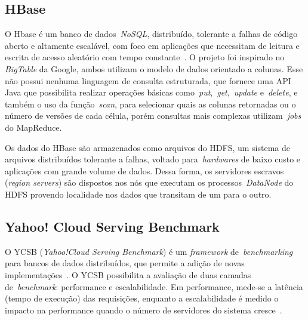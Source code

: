 \documentclass[12pt]{article}
\begin{document}

\subsection{HBase}
\label{subsec:hbase}

O Hbase é um banco de dados~\textit{NoSQL}, distribuído, tolerante a falhas de código aberto e altamente escalável, com foco em aplicações que necessitam de leitura e escrita de acesso aleatório com tempo constante~\cite{hadoophbase}. O projeto foi inspirado no \textit{BigTable} da Google, ambos utilizam o modelo de dados orientado a colunas. Esse não possui nenhuma linguagem de consulta estruturada, que fornece uma API Java que possibilita realizar operações básicas como~\emph{put},~\emph{get},~\emph{update} e~\emph{delete}, e também o uso da função~\emph{scan}, para selecionar quais as colunas retornadas ou o número de versões de cada célula, porém consultas mais complexas utilizam~\emph{jobs} do MapReduce.

Os dados do HBase são armazenados como arquivos do HDFS, um sistema de arquivos distribuídos tolerante a falhas, voltado para~\emph{hardwares} de baixo custo e aplicações com grande volume de dados. Dessa forma, os servidores escravos (\emph{region servers}) são dispostos nos nós que executam os processos~\emph{DataNode} do HDFS provendo localidade nos dados que transitam de um para o outro.

\subsection{Yahoo! Cloud Serving Benchmark}
\label{subsec:ycsb}

O YCSB (\emph{Yahoo!Cloud Serving Benchmark}) é um \textit{framework} de~\emph{benchmarking} para bancos de dados distribuídos, que permite a adição de novas implementações~\cite{cooper2010benchmarking}. 
O YCSB possibilita a avaliação de duas camadas de~\textit{benchmark}: performance e escalabilidade. 
Em performance, mede-se a latência (tempo de execução) das requisições, enquanto a escalabilidade é medido o impacto na performance quando o número de servidores do sistema cresce~\cite{cooper2010benchmarking}.
\end{document}
